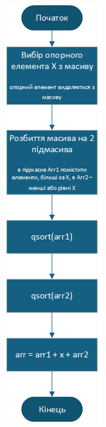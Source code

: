 \documentclass[12pt,a4paper]{article}
\begin{document}
    \begin{figure}[H]
        \begin{subfigure}{0.23\textwidth}
            \includegraphics[width=\linewidth]{arg_qsort.png}

\end{subfigure}
\end{figure}
\end{document}
